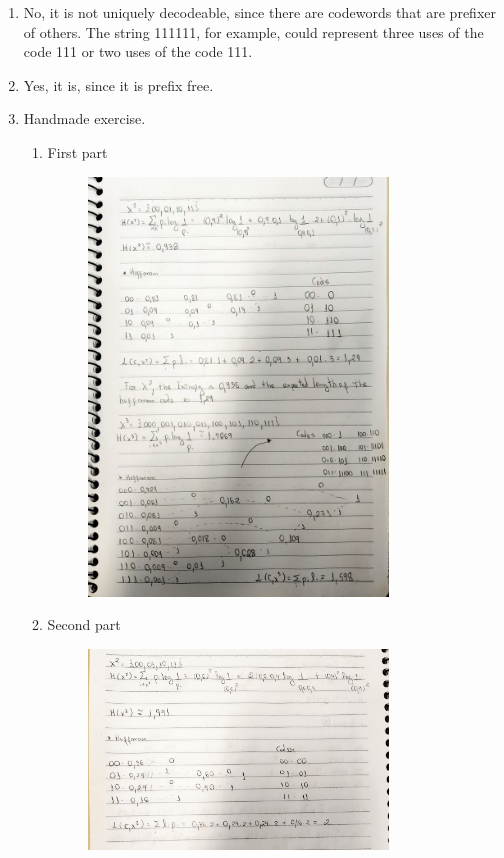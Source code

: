 \documentclass{article}
\begin{document}
\begin{enumerate}
	\item No, it is not uniquely decodeable, since there are codewords that are prefixer of others. The string 111111, for example, could represent three uses of the code 111 or two uses of the code 111.
	\item Yes, it is, since it is prefix free.
	\item Handmade exercise.
	      \begin{enumerate}
		      \item First part
		            \begin{figure}[H]
			            \centering
			            \includegraphics[width=0.8\textwidth]{images/it1-1.png}
		            \end{figure}
		      \item Second part
		            \begin{figure}[H]
			            \centering
			            \includegraphics[width=0.8\textwidth]{images/it2-1.png}

\end{figure}
\end{enumerate}
\end{enumerate}
\end{document}
